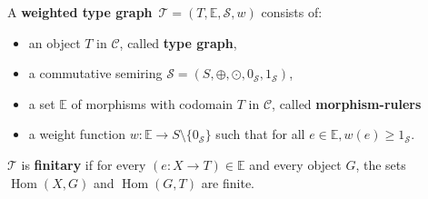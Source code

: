 \begin{definition}
    \label{wf:def:weighted_type_graph}
    A \textbf{weighted type graph}~\(\mathcal{T} = (T, \mathbb{E}, \mathcal{S}, w)\) consists of:
    \begin{itemize} 
        \item an object \(T\) in $\mathcal{C}$, called \textbf{type graph},
        \item a commutative semiring \(\mathcal{S}=(S, \oplus, \odot, 0_\mathcal{S}, 1_\mathcal{S})\),
        \item a set \(\mathbb{E}\) of morphisms with codomain $T$ in $\mathcal{C}$, called \textbf{morphism-rulers}
        \item a weight function \(w : \mathbb{E} \to S \setminus \{0_\mathcal{S}\}\) such that for all $e \in \mathbb{E}, w(e) \geq 1_\mathcal{S}$.
    \end{itemize}
    \(\mathcal{T}\) is \textbf{finitary} if for every \( (e :X \to T) \in \mathbb{E}\) and every object \(G\), the sets \(\operatorname{Hom}(X, G)\) and \(\operatorname{Hom}(G, T)\) are finite.
\end{definition}

